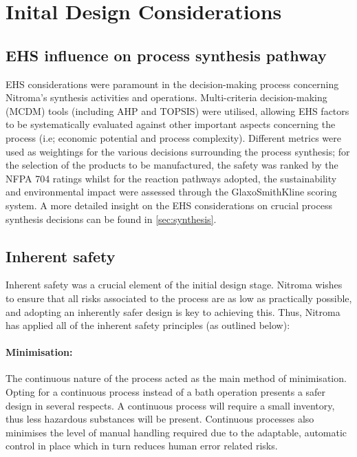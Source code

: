  
\section{Inital Design Considerations}

\subsection{EHS influence on process synthesis pathway}

EHS considerations were paramount in the decision-making process concerning Nitroma’s synthesis activities and operations. Multi-criteria decision-making (MCDM) tools (including AHP and TOPSIS) were utilised, allowing EHS factors to be systematically evaluated against other important aspects concerning the process (i.e; economic potential and process complexity). Different metrics were used as weightings for the various decisions surrounding the process synthesis; for the selection of the products to be manufactured, the safety was ranked by the NFPA 704 ratings whilst for the reaction pathways adopted, the sustainability and environmental impact were assessed through the GlaxoSmithKline scoring system. A more detailed insight on the EHS considerations on crucial process synthesis decisions can be found in \cref{sec:synthesis}. 

\subsection{Inherent safety}

Inherent safety was a crucial element of the initial design stage. Nitroma wishes to ensure that all risks associated to the process are as low as practically possible, and adopting an inherently safer design is key to achieving this. Thus, Nitroma has applied all of the inherent safety principles (as outlined below): 

\paragraph{Minimisation:} The continuous nature of the process acted as the main method of minimisation. Opting for a continuous process instead of a bath operation presents a safer design in several respects. A continuous process will require a small inventory, thus less hazardous substances will be present. Continuous processes also minimises the level of manual handling required due to the adaptable, automatic control in place which in turn reduces human error related risks.  


